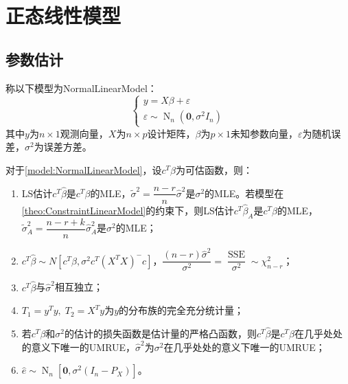 \section{正态线性模型}
\subsection{参数估计}
\begin{definition}\label{model:NormalLinearModel}
	称以下模型为\gls{NormalLinearModel}：
	\begin{equation*}
		\begin{cases}
			y=X\beta+\varepsilon \\
			\varepsilon\sim\operatorname{N}_n(\mathbf{0},\sigma^2I_n)
		\end{cases}
	\end{equation*}
	其中$y$为$n\times 1$观测向量，$X$为$n\times p$设计矩阵，$\beta$为$p\times 1$未知参数向量，$\varepsilon$为随机误差，$\sigma^2$为误差方差。
\end{definition}
\begin{property}\label{prop:NormalLinearModel}
	对于\cref{model:NormalLinearModel}，设$c^T\beta$为可估函数，则：
	\begin{enumerate}
		\item LS估计$c^T\hat{\beta}$是$c^T\beta$的MLE，$\tilde{\sigma}^2=\dfrac{n-r}{n}\hat{\sigma}^2$是$\sigma^2$的MLE。若模型在\cref{theo:ConstraintLinearModel}的约束下，则LS估计$c^T\hat{\beta}_A$是$c^T\beta$的MLE，$\tilde{\sigma}_A^2=\dfrac{n-r+k}{n}\hat{\sigma}_A^2$是$\sigma^2$的MLE；
		\item $c^T\hat{\beta}\sim N[c^T\beta,\sigma^2c^T(X^TX)^-c]$，$\dfrac{(n-r)\hat{\sigma}^2}{\sigma^2}=\dfrac{\operatorname{SSE}}{\sigma^2}\sim\chi_{n-r}^2$；
		\item $c^T\hat{\beta}$与$\hat{\sigma}^2$相互独立；
		\item $T_1=y^Ty,\;T_2=X^Ty$为$y$的分布族的完全充分统计量；
		\item 若$c^T\beta$和$\sigma^2$的估计的损失函数是估计量的严格凸函数，则$c^T\hat{\beta}$是$c^T\beta$在几乎处处的意义下唯一的UMRUE，$\hat{\sigma}^2$为$\sigma^2$在几乎处处的意义下唯一的UMRUE；
		\item $\hat{e}\sim\operatorname{N}_n[\mathbf{0},\sigma^2(I_n-P_X)]$。
	\end{enumerate}
\end{property}
